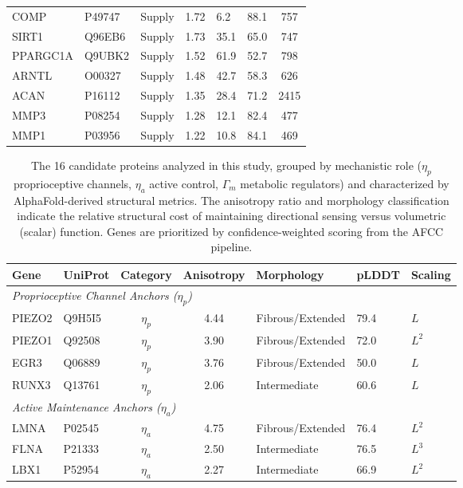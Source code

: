\begin{table}[h!]
\begin{tabular}{llccllc}
COMP & P49747 & Supply & 1.72 & 6.2 & 88.1 & 757 \\
SIRT1 & Q96EB6 & Supply & 1.73 & 35.1 & 65.0 & 747 \\
PPARGC1A & Q9UBK2 & Supply & 1.52 & 61.9 & 52.7 & 798 \\
ARNTL & O00327 & Supply & 1.48 & 42.7 & 58.3 & 626 \\
ACAN & P16112 & Supply & 1.35 & 28.4 & 71.2 & 2415 \\
MMP3 & P08254 & Supply & 1.28 & 12.1 & 82.4 & 477 \\
MMP1 & P03956 & Supply & 1.22 & 10.8 & 84.1 & 469 \\
\bottomrule
\end{tabular}
\end{table}

\begin{table}[h!]
\centering
\caption{The 16 candidate proteins analyzed in this study, grouped by mechanistic role ($\eta_p$ proprioceptive channels, $\eta_a$ active control, $\Gamma_m$ metabolic regulators) and characterized by AlphaFold-derived structural metrics. The anisotropy ratio and morphology classification indicate the relative structural cost of maintaining directional sensing versus volumetric (scalar) function. Genes are prioritized by confidence-weighted scoring from the AFCC pipeline.}
\label{tab:dissipation_proteins}
\scriptsize
\begin{tabular}{llcclll}
\toprule
\textbf{Gene} & \textbf{UniProt} & \textbf{Category} & \textbf{Anisotropy} & \textbf{Morphology} & \textbf{pLDDT} & \textbf{Scaling} \\
\midrule
\multicolumn{7}{l}{\textit{Proprioceptive Channel Anchors ($\eta_p$)}} \\
PIEZO2 & Q9H5I5 & $\eta_{p}$ & 4.44 & Fibrous/Extended & 79.4 & $L$ \\
PIEZO1 & Q92508 & $\eta_{p}$ & 3.90 & Fibrous/Extended & 72.0 & $L^2$ \\
EGR3 & Q06889 & $\eta_{p}$ & 3.76 & Fibrous/Extended & 50.0 & $L$ \\
RUNX3 & Q13761 & $\eta_{p}$ & 2.06 & Intermediate & 60.6 & $L$ \\
\midrule
\multicolumn{7}{l}{\textit{Active Maintenance Anchors ($\eta_a$)}} \\
LMNA & P02545 & $\eta_{a}$ & 4.75 & Fibrous/Extended & 76.4 & $L^2$ \\
FLNA & P21333 & $\eta_{a}$ & 2.50 & Intermediate & 76.5 & $L^3$ \\
LBX1 & P52954 & $\eta_{a}$ & 2.27 & Intermediate & 66.9 & $L^2$ \\

\end{tabular}
\end{table}
